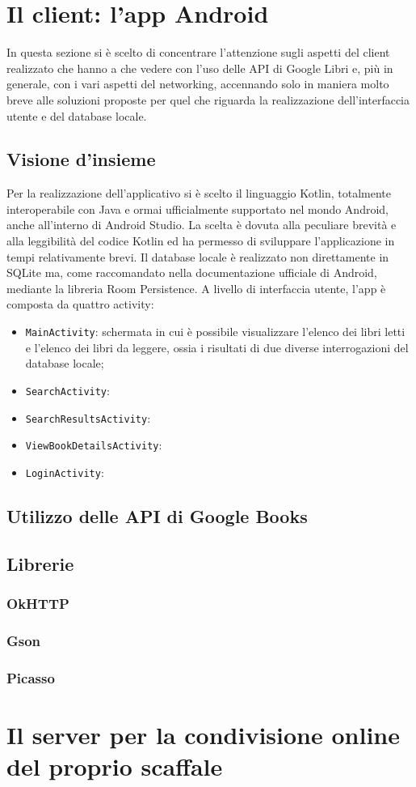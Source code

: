 \documentclass[a4paper]{article}
\def\code#1{\texttt{#1}}
\begin{document}
\section{Il client: l'app Android}
In questa sezione si è scelto di concentrare l'attenzione sugli aspetti del client realizzato che hanno a che vedere con l'uso delle API di Google Libri e, più in generale, con i vari aspetti del networking, accennando solo in maniera molto breve alle soluzioni proposte per quel che riguarda la realizzazione dell'interfaccia utente e del database locale.
	\subsection{Visione d'insieme}
	Per la realizzazione dell'applicativo si è scelto il linguaggio Kotlin, totalmente interoperabile con Java e ormai ufficialmente supportato nel mondo Android, anche all'interno di Android Studio. La scelta è dovuta alla peculiare brevità e alla leggibilità del codice Kotlin ed ha permesso di sviluppare l'applicazione in tempi relativamente brevi.\newline
	Il database locale è realizzato non direttamente in SQLite ma, come raccomandato nella documentazione ufficiale di Android, mediante la libreria Room Persistence.
	A livello di interfaccia utente, l'app è composta da quattro activity:
	\begin{itemize}
		\item \code{MainActivity}: schermata in cui è possibile visualizzare l'elenco dei libri letti e l'elenco dei libri da leggere, ossia i risultati di due diverse interrogazioni del database locale;
		\item \code{SearchActivity}: %
		\item \code{SearchResultsActivity}: %
		\item \code{ViewBookDetailsActivity}: %
		\item \code{LoginActivity}: %
	\end{itemize}
	\subsection{Utilizzo delle API di Google Books}
	\subsection{Librerie}
		\subsubsection{OkHTTP}
		\subsubsection{Gson}
		\subsubsection{Picasso}

\newpage
\section{Il server per la condivisione online del proprio scaffale}
\end{document}
